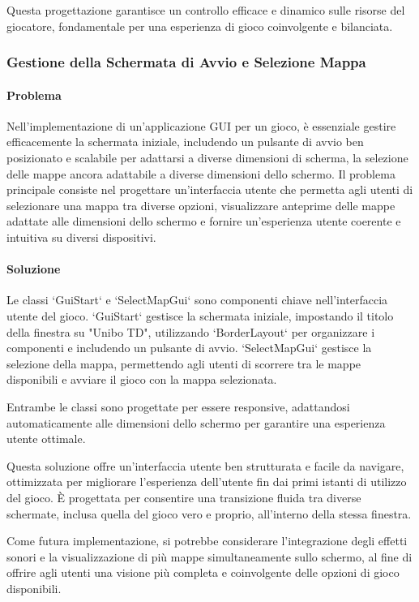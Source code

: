 \documentclass[a4paper,12pt]{report}
\begin{document}
Questa progettazione garantisce un controllo efficace e dinamico sulle risorse del giocatore, fondamentale per una esperienza di gioco coinvolgente e bilanciata.

\subsubsection{Gestione della Schermata di Avvio e Selezione Mappa}
\paragraph{Problema} Nell'implementazione di un'applicazione GUI per un gioco, è essenziale gestire efficacemente la schermata iniziale, includendo un pulsante di avvio ben posizionato e scalabile per adattarsi a diverse dimensioni di scherma, la selezione delle mappe ancora adattabile a diverse dimensioni dello schermo. Il problema principale consiste nel progettare un'interfaccia utente che permetta agli utenti di selezionare una mappa tra diverse opzioni, visualizzare anteprime delle mappe adattate alle dimensioni dello schermo e fornire un'esperienza utente coerente e intuitiva su diversi dispositivi.
\paragraph{Soluzione} Le classi `GuiStart` e `SelectMapGui` sono componenti chiave nell'interfaccia utente del gioco. `GuiStart` gestisce la schermata iniziale, impostando il titolo della finestra su "Unibo TD", utilizzando `BorderLayout` per organizzare i componenti e includendo un pulsante di avvio. `SelectMapGui` gestisce la selezione della mappa, permettendo agli utenti di scorrere tra le mappe disponibili e avviare il gioco con la mappa selezionata.

Entrambe le classi sono progettate per essere responsive, adattandosi automaticamente alle dimensioni dello schermo per garantire una esperienza utente ottimale.

Questa soluzione offre un'interfaccia utente ben strutturata e facile da navigare, ottimizzata per migliorare l'esperienza dell'utente fin dai primi istanti di utilizzo del gioco. È progettata per consentire una transizione fluida tra diverse schermate, inclusa quella del gioco vero e proprio, all'interno della stessa finestra.

Come futura implementazione, si potrebbe considerare l'integrazione degli effetti sonori e la visualizzazione di più mappe simultaneamente sullo schermo, al fine di offrire agli utenti una visione più completa e coinvolgente delle opzioni di gioco disponibili.
\end{document}
